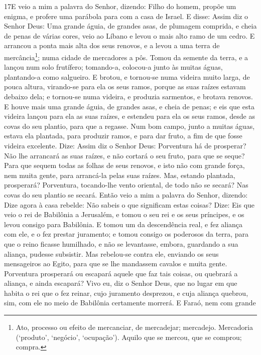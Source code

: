 \medskip

\lettrine{17} E veio a mim a palavra do Senhor, dizendo:
Filho do homem, propõe um enigma, e profere uma parábola para
com a casa de Israel. E disse: Assim diz o Senhor Deus: Uma
grande águia, de grandes asas, de plumagem comprida, e cheia de
penas de várias cores, veio ao Líbano e levou o mais alto ramo de um
cedro. E arrancou a ponta mais alta dos seus renovos, e a levou
a uma terra de mercância\footnote{Ato, processo ou efeito de
mercanciar, de mercadejar; mercadejo. Mercadoria (`produto',
`negócio', `ocupação'). Aquilo que se mercou, que se comprou;
compra.}; numa cidade de mercadores a pôs. Tomou da semente da
terra, e a lançou num solo frutífero; tomando-a, colocou-a junto às
muitas águas, plantando-a como salgueiro. E brotou, e tornou-se
numa videira muito larga, de pouca altura, virando-se para ela os
seus ramos, porque as suas raízes estavam debaixo dela; e tornou-se
numa videira, e produzia sarmentos, e brotava renovos. E houve
mais uma grande águia, de grandes asas, e cheia de penas; e eis que
esta videira lançou para ela as suas raízes, e estendeu para ela os
seus ramos, desde as covas do seu plantio, para que a regasse.
Num bom campo, junto a muitas águas, estava ela plantada, para
produzir ramos, e para dar fruto, a fim de que fosse videira
excelente. Dize: Assim diz o Senhor Deus: Porventura há de
prosperar? Não lhe arrancará as suas raízes, e não cortará o seu
fruto, para que se seque? Para que sequem todas as folhas de seus
renovos, e isto não com grande força, nem muita gente, para
arrancá-la pelas suas raízes. Mas, estando plantada,
prosperará? Porventura, tocando-lhe vento oriental, de todo não se
secará? Nas covas do seu plantio se secará. Então veio a mim
a palavra do Senhor, dizendo: Dize agora à casa rebelde: Não
sabeis o que significam estas coisas? Dize: Eis que veio o rei de
Babilônia a Jerusalém, e tomou o seu rei e os seus príncipes, e os
levou consigo para Babilônia. E tomou um da descendência
real, e fez aliança com ele, e o fez prestar juramento; e tomou
consigo os poderosos da terra, para que o reino ficasse
humilhado, e não se levantasse, embora, guardando a sua aliança,
pudesse subsistir. Mas rebelou-se contra ele, enviando os
seus mensageiros ao Egito, para que se lhe mandassem cavalos e muita
gente. Porventura prosperará ou escapará aquele que faz tais coisas,
ou quebrará a aliança, e ainda escapará? Vivo eu, diz o
Senhor Deus, que no lugar em que habita o rei que o fez reinar, cujo
juramento desprezou, e cuja aliança quebrou, sim, com ele no meio de
Babilônia certamente morrerá. E Faraó, nem com grande
